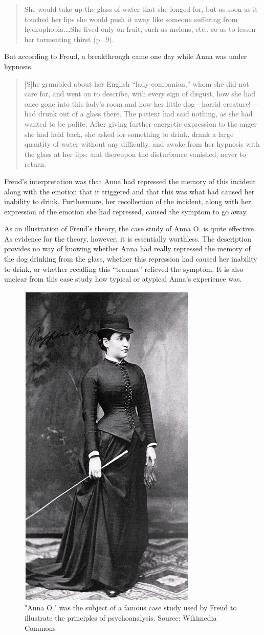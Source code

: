 \documentclass[
]{krantz}
\begin{document}
\begin{quote}
She would take up the glass of water that she longed for, but as soon as it touched her lips she would push it away like someone suffering from hydrophobia.\ldots She lived only on fruit, such as melons, etc., so as to lessen her tormenting thirst (p.~9).
\end{quote}

But according to Freud, a breakthrough came one day while Anna was under hypnosis.

\begin{quote}
{[}S{]}he grumbled about her English ``lady-companion,'' whom she did not care for, and went on to describe, with every sign of disgust, how she had once gone into this lady's room and how her little dog---horrid creature!---had drunk out of a glass there. The patient had said nothing, as she had wanted to be polite. After giving further energetic expression to the anger she had held back, she asked for something to drink, drank a large quantity of water without any difficulty, and awoke from her hypnosis with the glass at her lips; and thereupon the disturbance vanished, never to return.
\end{quote}

Freud's interpretation was that Anna had repressed the memory of this incident along with the emotion that it triggered and that this was what had caused her inability to drink. Furthermore, her recollection of the incident, along with her expression of the emotion she had repressed, caused the symptom to go away.

As an illustration of Freud's theory, the case study of Anna O. is quite effective. As evidence for the theory, however, it is essentially worthless. The description provides no way of knowing whether Anna had really repressed the memory of the dog drinking from the glass, whether this repression had caused her inability to drink, or whether recalling this ``trauma'' relieved the symptom. It is also unclear from this case study how typical or atypical Anna's experience was.

\begin{figure}

{\centering \includegraphics[width=0.3\linewidth]{images/single-N/annao} 

}

\caption{"Anna O." was the subject of a famous case study used by Freud to illustrate the principles of psychoanalysis. Source: Wikimedia Commons}\label{fig:annao}
\end{figure}
\end{document}

